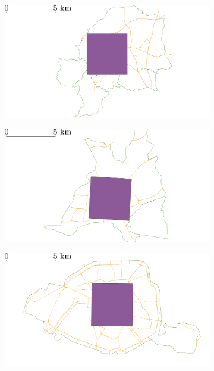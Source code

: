 \begin{figure}[H]
    \centering
    \begin{subfigure}[t]{0.32\linewidth}
        \includegraphics[width=\textwidth]{images/evaluation/crseg/clermont.pdf}
        \caption{}
        \label{fig:clermontRegion}
    \end{subfigure}
    \hfill
    \begin{subfigure}[t]{0.32\linewidth}
        \includegraphics[width=\textwidth]{images/evaluation/crseg/nantes.pdf}
        \caption{}
        \label{fig:nantesRegion}
    \end{subfigure}
    \begin{subfigure}[t]{0.32\linewidth}
        \includegraphics[width=\textwidth]{images/evaluation/crseg/paris.pdf}

\end{subfigure}
\end{figure}
